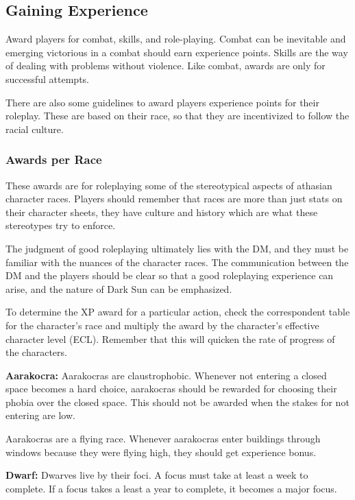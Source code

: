 \subsection{Gaining Experience}
Award players for combat, skills, and role-playing. Combat can be inevitable and emerging victorious in a combat should earn experience points. Skills are the way of dealing with problems without violence. Like combat, awards are only for successful attempts.

There are also some guidelines to award players experience points for their roleplay. These are based on their race, so that they are incentivized to follow the racial culture.

\subsubsection{Awards per Race}
These awards are for roleplaying some of the stereotypical aspects of athasian character races. Players should remember that races are more than just stats on their character sheets, they have culture and history which are what these stereotypes try to enforce.

The judgment of good roleplaying ultimately lies with the DM, and they must be familiar with the nuances of the character races. The communication between the DM and the players should be clear so that a good roleplaying experience can arise, and the nature of {\tableheader Dark Sun} can be emphasized.

To determine the XP award for a particular action, check the correspondent table for the character's race and multiply the award by the character's effective character level (ECL). Remember that this will quicken the rate of progress of the characters.

\textbf{Aarakocra:} Aarakocras are claustrophobic. Whenever not entering a closed space becomes a hard choice, aarakocras should be rewarded for choosing their phobia over the closed space. This should not be awarded when the stakes for not entering are low.

Aarakocras are a flying race. Whenever aarakocras enter buildings through windows because they were flying high, they should get experience bonus.


\textbf{Dwarf:} Dwarves live by their foci. A focus must take at least a week to complete. If a focus takes a least a year to complete, it becomes a major focus.

